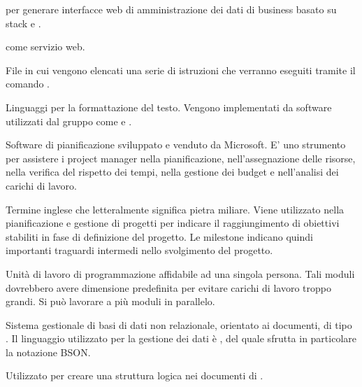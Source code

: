 
\begin{itemize}


 per generare interfacce web di amministrazione dei dati di business basato su stack  e .


\ProjectName{} come servizio web.


File in cui vengono elencati una serie di istruzioni che verranno eseguiti tramite il comando .


Linguaggi per la formattazione del testo. Vengono implementati da software utilizzati dal gruppo come  e .


Software di pianificazione sviluppato e venduto da Microsoft. E'  uno strumento per assistere i project manager nella pianificazione, nell'assegnazione delle risorse, nella verifica del rispetto dei tempi, nella gestione dei budget e nell'analisi dei carichi di lavoro.


Termine inglese che letteralmente significa pietra miliare. Viene utilizzato nella pianificazione e gestione di progetti per indicare il raggiungimento di obiettivi stabiliti in fase di definizione del progetto. 
Le milestone indicano quindi importanti traguardi intermedi nello svolgimento del progetto.


Unità di lavoro di programmazione affidabile ad una singola persona. Tali moduli dovrebbero avere dimensione predefinita per evitare carichi di lavoro troppo grandi. Si può lavorare a più moduli in parallelo.


Sistema gestionale di basi di dati non relazionale, orientato ai documenti, di tipo . Il linguaggio utilizzato per la gestione dei dati è , del quale sfrutta in particolare la notazione BSON.


Utilizzato per creare una struttura logica nei documenti di .

\end{itemize}

